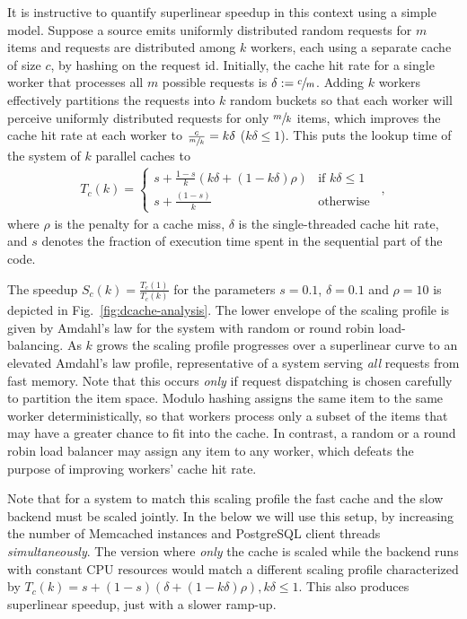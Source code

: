 It is instructive to quantify superlinear speedup in this context using a simple model. Suppose a source emits uniformly distributed random requests for $m$ items and requests are distributed among $k$ workers, each using a separate cache of size $c$, by hashing on the request id.  Initially, the cache hit rate for a single worker that processes all $m$ possible requests is $\delta := \sfrac{c}{m}$. Adding $k$ workers effectively partitions the requests into $k$ random buckets so that each worker will perceive uniformly distributed requests for only $\sfrac{m}{k}$ items, which improves the cache hit rate at each worker to $\frac{c}{\sfrac{m}{k}} = k\delta$ ($k\delta \le 1$). This puts the lookup time of the system of $k$ parallel caches to
\begin{align}\label{eq:dist-cache}
  T_c(k) = \begin{cases} s + \frac{1-s}{k}(k\delta + (1-k\delta)\rho) & \text{if } k\delta \le 1\\s + \frac{(1-s)}{k} & \text{otherwise}\end{cases} \enspace ,
\end{align}
where $\rho$ is the penalty for a cache miss, $\delta$ is the single-threaded cache hit rate, and $s$ denotes the fraction of execution time spent in the sequential part of the code.

The speedup $S_c(k)=\frac{T_c(1)}{T_c(k)}$ for the parameters $s=0.1$, $\delta=0.1$ and $\rho=10$ is depicted in Fig.~\ref{fig:dcache-analysis}. The lower envelope of the scaling profile is given by Amdahl's law for the system with random or round robin load-balancing. %
As $k$ grows the scaling profile progresses over a superlinear curve to an elevated Amdahl's law profile, representative of a system serving \emph{all} requests from fast memory. %
Note that this occurs \emph{only} if request dispatching is chosen carefully to partition the item space. Modulo hashing assigns the same item to the same worker deterministically, so that workers process only a subset of the items that may have a greater chance to fit into the cache. In contrast, a random or a round robin load balancer may assign any item to any worker, which defeats the purpose of improving workers' cache hit rate. %

Note that for a system to match this scaling profile the fast cache and the slow backend must be scaled jointly. In the below we will use this setup, by increasing the number of Memcached instances and PostgreSQL client threads \emph{simultaneously}. The version where \emph{only} the cache is scaled while the backend runs with constant CPU resources would match a different scaling profile characterized by $T_c(k) = s + (1-s)(\delta + (1-k\delta)\rho), k\delta \le 1$. This also produces superlinear speedup, just with a slower ramp-up.

